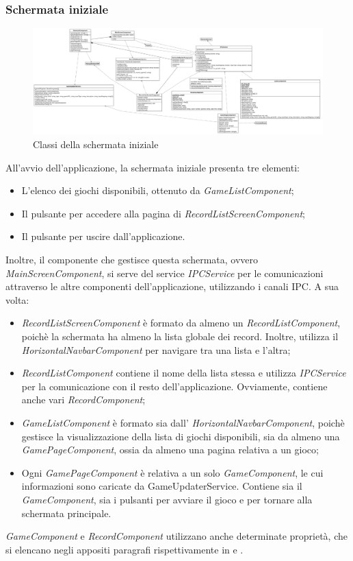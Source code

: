 \subsubsection{Schermata iniziale}
\begin{figure}[h]
    \centering
    \includegraphics[width=340pt]{images/prog/MainScreen.png}
    \caption{Classi della schermata iniziale}
    \label{fig:schermataIniziale}
\end{figure}
All'avvio dell'applicazione, la schermata iniziale presenta tre elementi:
\begin{itemize}
    \item L'elenco dei giochi disponibili, ottenuto da \emph{GameListComponent};
    \item Il pulsante per accedere alla pagina di \emph{RecordListScreenComponent};
    \item Il pulsante per uscire dall'applicazione.
\end{itemize}
Inoltre, il componente che gestisce questa schermata, ovvero \emph{MainScreenComponent}, si serve del service \emph{IPCService} per le comunicazioni attraverso le altre componenti dell'applicazione, utilizzando i canali IPC.
A sua volta:
\begin{itemize}
    \item \emph{RecordListScreenComponent} è formato da almeno un \emph{RecordListComponent}, poichè la schermata ha almeno la lista globale dei record. Inoltre, utilizza il \emph{HorizontalNavbarComponent} per navigare tra una lista e l'altra;
    \item \emph{RecordListComponent} contiene il nome della lista stessa e utilizza \emph{IPCService} per la comunicazione con il resto dell'applicazione. Ovviamente, contiene anche vari \emph{RecordComponent};
    \item \emph{GameListComponent} è formato sia dall' \emph{HorizontalNavbarComponent}, poichè gestisce la visualizzazione della lista di giochi disponibili, sia da almeno una \emph{GamePageComponent}, ossia da almeno una pagina relativa a un gioco;
    \item Ogni \emph{GamePageComponent} è relativa a un solo \emph{GameComponent}, le cui informazioni sono caricate da GameUpdaterService. Contiene sia il \emph{GameComponent}, sia i pulsanti per avviare il gioco e per tornare alla schermata principale.
\end{itemize}
\emph{GameComponent} e \emph{RecordComponent} utilizzano anche determinate proprietà, che si elencano negli appositi paragrafi rispettivamente in  e .
\newpage
